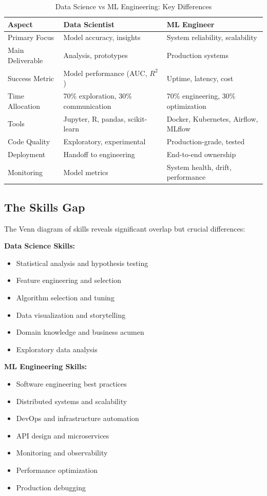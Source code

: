 \begin{table}[h]
\centering
\caption{Data Science vs ML Engineering: Key Differences}
\label{tab:ds_vs_mle}
\begin{tabular}{@{}p{}p{}p{}@{}}
\toprule
\textbf{Aspect} & \textbf{Data Scientist} & \textbf{ML Engineer} \\
\midrule
Primary Focus & Model accuracy, insights & System reliability, scalability \\
Main Deliverable & Analysis, prototypes & Production systems \\
Success Metric & Model performance (AUC, $R^2$) & Uptime, latency, cost \\
Time Allocation & 70\% exploration, 30\% communication & 70\% engineering, 30\% optimization \\
Tools & Jupyter, R, pandas, scikit-learn & Docker, Kubernetes, Airflow, MLflow \\
Code Quality & Exploratory, experimental & Production-grade, tested \\
Deployment & Handoff to engineering & End-to-end ownership \\
Monitoring & Model metrics & System health, drift, performance \\
\bottomrule
\end{tabular}
\end{table}

\subsection{The Skills Gap}

The Venn diagram of skills reveals significant overlap but crucial differences:

\textbf{Data Science Skills:}
\begin{itemize}
    \item Statistical analysis and hypothesis testing
    \item Feature engineering and selection
    \item Algorithm selection and tuning
    \item Data visualization and storytelling
    \item Domain knowledge and business acumen
    \item Exploratory data analysis
\end{itemize}

\textbf{ML Engineering Skills:}
\begin{itemize}
    \item Software engineering best practices
    \item Distributed systems and scalability
    \item DevOps and infrastructure automation
    \item API design and microservices
    \item Monitoring and observability
    \item Performance optimization
    \item Production debugging
\end{itemize}


